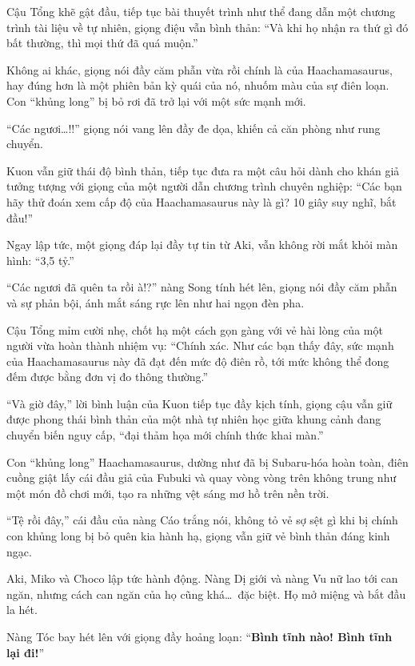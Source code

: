 \documentclass[../main.tex]{subfiles}
\begin{document}

Cậu Tổng khẽ gật đầu, tiếp tục bài thuyết trình như thể đang dẫn một chương trình tài liệu về tự nhiên, giọng điệu vẫn bình thản: ``Và khi họ nhận ra thứ gì đó bất thường, thì mọi thứ đã quá muộn.''

Không ai khác, giọng nói đầy căm phẫn vừa rồi chính là của Haachamasaurus, hay đúng hơn là một phiên bản kỳ quái của nó, nhuốm màu của sự điên loạn. Con ``khủng long'' bị bỏ rơi đã trở lại với một sức mạnh mới.

``Các ngươi\dots!!'' giọng nói vang lên đầy đe dọa, khiến cả căn phòng như rung chuyển.

Kuon vẫn giữ thái độ bình thản, tiếp tục đưa ra một câu hỏi dành cho khán giả tưởng tượng với giọng của một người dẫn chương trình chuyên nghiệp: ``Các bạn hãy thử đoán xem cấp độ của Haachamasaurus này là gì? 10 giây suy nghĩ, bắt đầu!''

Ngay lập tức, một giọng đáp lại đầy tự tin từ Aki, vẫn không rời mắt khỏi màn hình: ``3,5 tỷ.''

``Các ngươi đã quên ta rồi à!?'' nàng Song tính hét lên, giọng nói đầy căm phẫn và sự phản bội, ánh mắt sáng rực lên như hai ngọn đèn pha.

Cậu Tổng mỉm cười nhẹ, chốt hạ một cách gọn gàng với vẻ hài lòng của một người vừa hoàn thành nhiệm vụ: ``Chính xác. Như các bạn thấy đây, sức mạnh của Haachamasaurus này đã đạt đến mức độ điên rồ, tới mức không thể đong đếm được bằng đơn vị đo thông thường.''

``Và giờ đây,'' lời bình luận của Kuon tiếp tục đầy kịch tính, giọng cậu vẫn giữ được phong thái bình thản của một nhà tự nhiên học giữa khung cảnh đang chuyển biến nguy cấp, ``đại thảm họa mới chính thức khai màn.''

Con ``khủng long'' Haachamasaurus, dường như đã bị Subaru-hóa hoàn toàn, điên cuồng giật lấy cái đầu giả của Fubuki và quay vòng vòng trên không trung như một món đồ chơi mới, tạo ra những vệt sáng mơ hồ trên nền trời.

``Tệ rồi đây,'' cái đầu của nàng Cáo trắng nói, không tỏ vẻ sợ sệt gì khi bị chính con khủng long bị bỏ quên kia hành hạ, giọng vẫn giữ vẻ bình thản đáng kinh ngạc.

Aki, Miko và Choco lập tức hành động. Nàng Dị giới và nàng Vu nữ lao tới can ngăn, nhưng cách can ngăn của họ cũng khá\dots\ đặc biệt. Họ mở miệng và bắt đầu la hét.

Nàng Tóc bay hét lên với giọng đầy hoảng loạn: ``\textbf{Bình tĩnh nào! Bình tĩnh lại đi!}''
\end{document}
